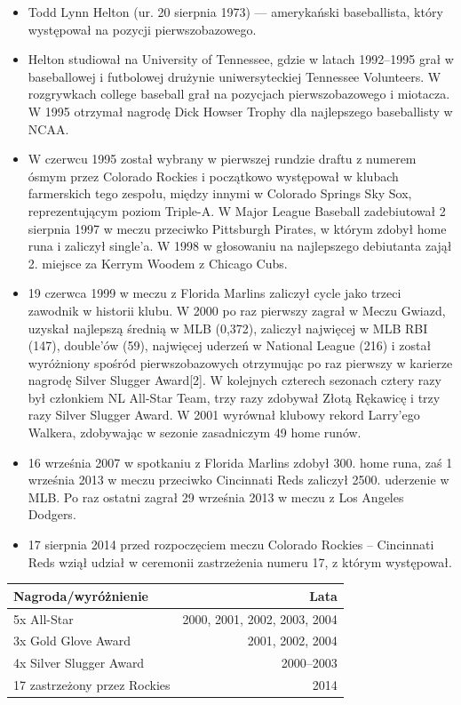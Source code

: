 \documentclass[a4paper,12pt]{article}
\begin{document}
\begin{itemize}
\item
Todd Lynn Helton (ur. 20 sierpnia 1973) --- amerykański baseballista, który występował na pozycji pierwszobazowego.
\item
Helton studiował na University of Tennessee, gdzie w latach 1992–1995 grał w baseballowej i futbolowej drużynie uniwersyteckiej Tennessee Volunteers. W rozgrywkach college baseball grał na pozycjach pierwszobazowego i miotacza. W 1995 otrzymał nagrodę Dick Howser Trophy dla najlepszego baseballisty w NCAA.
\item
W czerwcu 1995 został wybrany w pierwszej rundzie draftu z numerem ósmym przez Colorado Rockies i początkowo występował w klubach farmerskich tego zespołu, między innymi w Colorado Springs Sky Sox, reprezentującym poziom Triple-A. W Major League Baseball zadebiutował 2 sierpnia 1997 w meczu przeciwko Pittsburgh Pirates, w którym zdobył home runa i zaliczył single’a. W 1998 w głosowaniu na najlepszego debiutanta zajął 2. miejsce za Kerrym Woodem z Chicago Cubs.
\item
19 czerwca 1999 w meczu z Florida Marlins zaliczył cycle jako trzeci zawodnik w historii klubu. W 2000 po raz pierwszy zagrał w Meczu Gwiazd, uzyskał najlepszą średnią w MLB (0,372), zaliczył najwięcej w MLB RBI (147), double’ów (59), najwięcej uderzeń w National League (216) i został wyróżniony spośród pierwszobazowych otrzymując po raz pierwszy w karierze nagrodę Silver Slugger Award[2]. W kolejnych czterech sezonach cztery razy był członkiem NL All-Star Team, trzy razy zdobywał Złotą Rękawicę i trzy razy Silver Slugger Award. W 2001 wyrównał klubowy rekord Larry’ego Walkera, zdobywając w sezonie zasadniczym 49 home runów.
\item
16 września 2007 w spotkaniu z Florida Marlins zdobył 300. home runa, zaś 1 września 2013 w meczu przeciwko Cincinnati Reds zaliczył 2500. uderzenie w MLB. Po raz ostatni zagrał 29 września 2013 w meczu z Los Angeles Dodgers.
\item
17 sierpnia 2014 przed rozpoczęciem meczu Colorado Rockies – Cincinnati Reds wziął udział w ceremonii zastrzeżenia numeru 17, z którym występował.
\end{itemize}

\begin{tabular}{||l||r||}
\hline
Nagroda/wyróżnienie & Lata\\
\hline
 5{x} All-Star & 2000, 2001, 2002, 2003, 2004\\
\hline
 3{x} Gold Glove Award & 2001, 2002, 2004\\
\hline
 4{x} Silver Slugger Award & 2000–2003\\
\hline
 17 zastrzeżony przez Rockies & 2014\\
\hline
\end{tabular}
\end{document}
